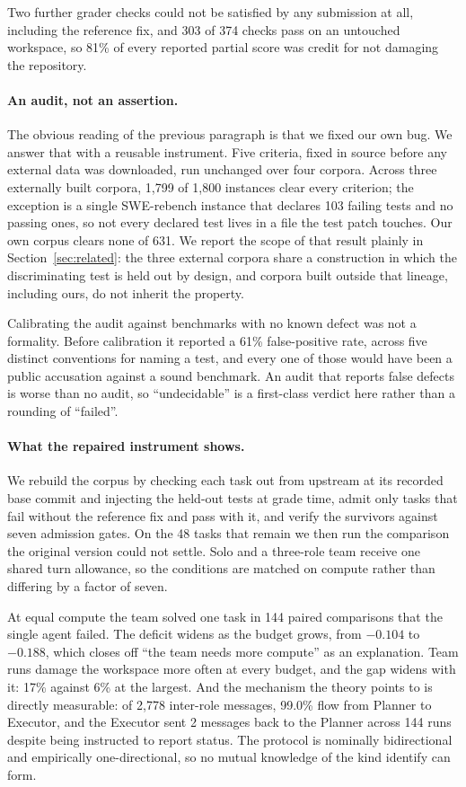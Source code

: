 \documentclass[11pt]{article}
\begin{document}
Two further grader checks could not be satisfied by any submission at all,
including the reference fix, and 303 of 374 checks pass on an untouched
workspace, so 81\% of every reported partial score was credit for not damaging
the repository.

\paragraph{An audit, not an assertion.} The obvious reading of the previous
paragraph is that we fixed our own bug. We answer that with a reusable
instrument. Five criteria, fixed in source before any external data was
downloaded, run unchanged over four corpora. Across three externally built
corpora, 1{,}799 of 1{,}800 instances clear every criterion; the exception is a
single SWE-rebench instance that declares 103 failing tests and no passing ones,
so not every declared test lives in a file the test patch touches. Our own
corpus clears none of 631. We report the scope of that result plainly in
Section~\ref{sec:related}: the three external corpora share a construction in
which the discriminating test is held out by design, and corpora built outside
that lineage, including ours, do not inherit the property.

Calibrating the audit against benchmarks with no known defect was not a
formality. Before calibration it reported a 61\% false-positive rate, across
five distinct conventions for naming a test, and every one of those would have
been a public accusation against a sound benchmark. An audit that reports false
defects is worse than no audit, so ``undecidable'' is a first-class verdict here
rather than a rounding of ``failed''.

\paragraph{What the repaired instrument shows.} We rebuild the corpus by
checking each task out from upstream at its recorded base commit and injecting
the held-out tests at grade time, admit only tasks that fail without the
reference fix and pass with it, and verify the survivors against seven admission
gates. On the 48 tasks that remain we then run the comparison the original
version could not settle. Solo and a three-role team receive one shared turn
allowance, so the conditions are matched on compute rather than differing by a
factor of seven.

At equal compute the team solved one task in 144 paired comparisons that the
single agent failed. The deficit widens as the budget grows, from $-0.104$ to
$-0.188$, which closes off ``the team needs more compute'' as an explanation.
Team runs damage the workspace more often at every budget, and the gap widens
with it: 17\% against 6\% at the largest. And the
mechanism the theory points to is directly measurable: of 2{,}778 inter-role
messages, 99.0\% flow from Planner to Executor, and the Executor sent 2 messages
back to the Planner across 144 runs despite being instructed to report status.
The protocol is nominally bidirectional and empirically one-directional, so no
mutual knowledge of the kind \citet{faraj2000coordinating} identify can form.
\end{document}
